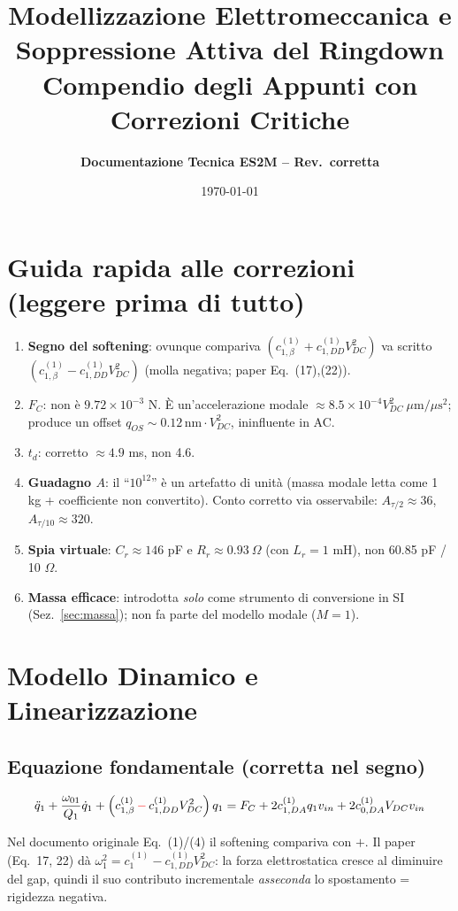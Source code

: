 \documentclass[11pt,a4paper]{article}
\title{\textbf{\Large Modellizzazione Elettromeccanica e Soppressione Attiva del Ringdown}\\
\large Compendio degli Appunti con Correzioni Critiche}
\author{\textbf{Documentazione Tecnica ES2M -- Rev.\ corretta}}
\date{\today}
\begin{document}
\maketitle
\tableofcontents
\newpage

\section*{Guida rapida alle correzioni (leggere prima di tutto)}
\begin{enumerate}
  \item \textbf{Segno del softening}: ovunque compariva $\left(c_{1,\beta}^{(1)}+c_{1,DD}^{(1)}V_{DC}^2\right)$ va scritto $\left(c_{1,\beta}^{(1)}-c_{1,DD}^{(1)}V_{DC}^2\right)$ (molla negativa; paper Eq.~(17),(22)).
  \item \textbf{$F_C$}: non \`e $9.72\times10^{-3}$ N. \`E un'accelerazione modale $\approx8.5\times10^{-4}V_{DC}^2\ \mu\mathrm{m}/\mu\mathrm{s}^2$; produce un offset $q_{OS}\sim0.12\,\mathrm{nm}\cdot V_{DC}^2$, ininfluente in AC.
  \item \textbf{$t_d$}: corretto $\approx4.9$ ms, non 4.6.
  \item \textbf{Guadagno $A$}: il ``$10^{12}$'' \`e un artefatto di unit\`a (massa modale letta come 1 kg + coefficiente non convertito). Conto corretto via osservabile: $A_{\tau/2}\approx36$, $A_{\tau/10}\approx320$.
  \item \textbf{Spia virtuale}: $C_r\approx146$ pF e $R_r\approx0.93\ \Omega$ (con $L_r=1$ mH), non 60.85 pF / 10 $\Omega$.
  \item \textbf{Massa efficace}: introdotta \emph{solo} come strumento di conversione in SI (Sez.~\ref{sec:massa}); non fa parte del modello modale ($M=1$).
\end{enumerate}

\section{Modello Dinamico e Linearizzazione}
\subsection{Equazione fondamentale (corretta nel segno)}
\begin{equation}
    \ddot{q}_1 + \frac{\omega_{01}}{Q_1}\dot{q}_1
    + \left(c_{1,\beta}^{(1)} \,\textcolor{red}{-}\, c_{1,DD}^{(1)}V_{DC}^2\right) q_1
    = F_C + 2c_{1,DA}^{(1)} q_1 v_{in} + 2c_{0,DA}^{(1)}V_{DC}v_{in}
    \label{eq:moto}
\end{equation}
\begin{corrbox}
Nel documento originale Eq.~(1)/(4) il softening compariva con $+$. Il paper (Eq.~17, 22) d\`a $\omega_1^2=c_1^{(1)}-c_{1,DD}^{(1)}V_{DC}^2$: la forza elettrostatica cresce al diminuire del gap, quindi il suo contributo incrementale \emph{asseconda} lo spostamento = rigidezza negativa.
\end{corrbox}
\end{document}
